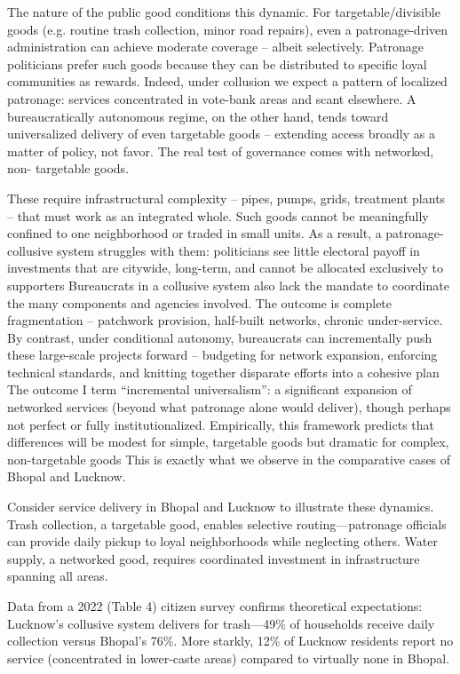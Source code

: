 The nature of the public good conditions this dynamic. For targetable/divisible goods (e.g. routine trash collection, minor road repairs), even a patronage-driven administration can achieve moderate coverage – albeit selectively. Patronage politicians prefer such goods because they can be distributed to specific loyal communities as rewards. Indeed, under collusion we expect a pattern of localized patronage: services concentrated in vote-bank areas and scant elsewhere. A bureaucratically autonomous regime, on the other hand, tends toward universalized delivery of even targetable goods – extending access broadly as a matter of policy, not favor. The real test of governance comes with networked, non- targetable goods.

These require infrastructural complexity – pipes, pumps, grids, treatment plants – that must work as an integrated whole. Such goods cannot be meaningfully confined to one neighborhood or traded in small units. As a result, a patronage-collusive system struggles with them: politicians see little electoral payoff in investments that are citywide, long-term, and cannot be allocated exclusively to supporters Bureaucrats in a collusive system also lack the mandate to coordinate the many components and agencies involved. The outcome is complete fragmentation – patchwork provision, half-built networks, chronic under-service. By contrast, under conditional autonomy, bureaucrats can incrementally push these large-scale projects forward – budgeting for network expansion, enforcing technical standards, and knitting together disparate efforts into a cohesive plan The outcome I term ``incremental universalism'': a significant expansion of networked services (beyond what patronage alone would deliver), though perhaps not perfect or fully institutionalized. Empirically, this framework predicts that differences will be modest for simple, targetable goods but dramatic for complex, non-targetable goods This is exactly what we observe in the comparative cases of Bhopal and Lucknow.

Consider service delivery in Bhopal and Lucknow to illustrate these dynamics. Trash collection, a targetable good, enables selective routing—patronage officials can provide daily pickup to loyal neighborhoods while neglecting others. Water supply, a networked good, requires coordinated investment in infrastructure spanning all areas.

Data from a 2022 (Table 4) citizen survey confirms theoretical expectations: Lucknow's collusive system delivers for trash—49\% of households receive daily collection versus Bhopal's 76\%. More starkly, 12\% of Lucknow residents report no service (concentrated in lower-caste areas) compared to virtually none in Bhopal.

